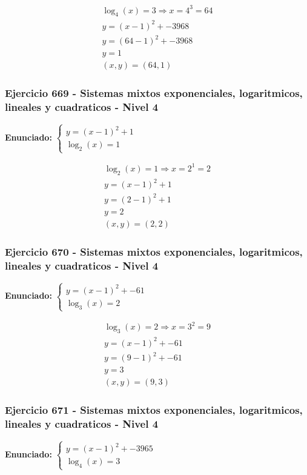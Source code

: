 \documentclass[12pt,a4paper]{article}
\begin{document}
\[
\begin{aligned}
\log_{4}\left(x\right)=3\Rightarrow x=4^{3}=64\\
y=(x-1)^2+-3968\\
y=(64-1)^2+-3968\\
y=1\\
\boxed{(x,y)=(64,1)}
\end{aligned}
\]


\subsubsection*{Ejercicio 669 - Sistemas mixtos exponenciales, logaritmicos, lineales y cuadraticos - Nivel 4}
\textbf{Enunciado:} \(\begin{cases} y=(x-1)^2+1\\ \log_{2}\left(x\right)=1\end{cases}\)

\[
\begin{aligned}
\log_{2}\left(x\right)=1\Rightarrow x=2^{1}=2\\
y=(x-1)^2+1\\
y=(2-1)^2+1\\
y=2\\
\boxed{(x,y)=(2,2)}
\end{aligned}
\]


\subsubsection*{Ejercicio 670 - Sistemas mixtos exponenciales, logaritmicos, lineales y cuadraticos - Nivel 4}
\textbf{Enunciado:} \(\begin{cases} y=(x-1)^2+-61\\ \log_{3}\left(x\right)=2\end{cases}\)

\[
\begin{aligned}
\log_{3}\left(x\right)=2\Rightarrow x=3^{2}=9\\
y=(x-1)^2+-61\\
y=(9-1)^2+-61\\
y=3\\
\boxed{(x,y)=(9,3)}
\end{aligned}
\]


\subsubsection*{Ejercicio 671 - Sistemas mixtos exponenciales, logaritmicos, lineales y cuadraticos - Nivel 4}
\textbf{Enunciado:} \(\begin{cases} y=(x-1)^2+-3965\\ \log_{4}\left(x\right)=3\end{cases}\)
\end{document}
